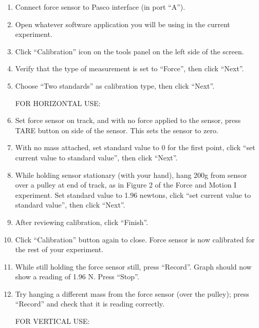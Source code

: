 \begin{enumerate}
\item Connect force sensor to Pasco interface (in port ``A'').

\item Open whatever software application you will be using in the current experiment.

\item Click ``Calibration'' icon on the tools panel on the left side of the screen.

\item Verify that the type of measurement is set to ``Force'', then click ``Next''.

\item Choose ``Two standards'' as calibration type, then click ``Next''.

\vspace{0.1in}
\hspace{-0.2in}FOR HORIZONTAL USE:

\item Set force sensor on track, and with no force applied to the sensor, press TARE button on side of the sensor. This sets the sensor to zero.

\item With no mass attached, set standard value to 0 for the first point, click ``set current value to standard value'', then click ``Next''.

\item While holding sensor stationary (with your hand), hang 200g from sensor over a pulley at end of track, as in Figure 2 of the Force and Motion I experiment. Set standard value to 1.96 newtons, click ``set current value to standard value'', then click ``Next''.

\item After reviewing calibration, click ``Finish''.

\item Click ``Calibration'' button again to close. Force sensor is now calibrated for the rest of your experiment.

\item While still holding the force sensor still, press ``Record''. Graph should now show a reading of 1.96 N. Press ``Stop''.

\item Try hanging a different mass from the force sensor (over the pulley); press ``Record'' and check that it is reading correctly.

\vspace{0.1in}
\hspace{-0.2in}FOR VERTICAL USE:


\end{enumerate}
